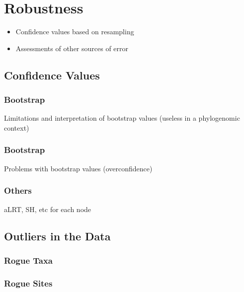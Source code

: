 \section{Robustness} \label{sec:robustness}

\begin{itemize}
 \item Confidence values based on resampling
 \item Assessments of other sources of error
\end{itemize}

\subsection{Confidence Values} \label{sec:confidence-values}

\subsubsection{Bootstrap} \label{sec:bootstrap}

Limitations and interpretation of bootstrap values (useless in a phylogenomic context)

\subsubsection{Bootstrap} \label{sec:posterior-probabilities}

Problems with bootstrap values (overconfidence)

\subsubsection{Others} \label{sec:other-confidence}

aLRT, SH, etc for each node

\subsection{Outliers in the Data} \label{sec:outliers}

\subsubsection{Rogue Taxa} \label{sec:rogue-taxa}

\subsubsection{Rogue Sites} \label{sec:rogue-sites}
